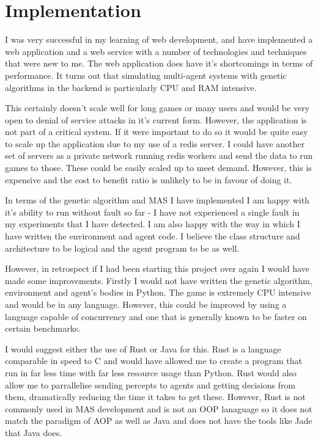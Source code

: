 \documentclass[]{final_report}
\begin{document}
\section{Implementation}
I was very successful in my learning of web development, and have implemented a web application and a web service with a number of technologies and techniques that were new to me. The web application does have it's shortcomings in terms of performance. It turns out that simulating multi-agent systems with genetic algorithms in the backend is particularly CPU and RAM intensive.\par 
This certainly doesn't scale well for long games or many users and would be very open to denial of service attacks in it's current form. However, the application is not part of a critical system. If it were important to do so it would be quite easy to scale up the application due to my use of a redis server. I could have another set of servers as a private network running redis workers and send the data to run games to those. These could be easily scaled up to meet demand. However, this is expensive and the cost to benefit ratio is unlikely to be in favour of doing it.\par
In terms of the genetic algorithm and MAS I have implemented I am happy with it's ability to run without fault so far - I have not experienced a single fault in my experiments that I have detected. I am also happy with the way in which I have written the environment and agent code. I believe the class structure and architecture to be logical and the agent program to be as well.\par
However, in retrospect if I had been starting this project over again I would have made some improvements. Firstly I would not have written the genetic algorithm, environment and agent's bodies in Python. The game is extremely CPU intensive and would be in any language. However, this could be improved by using a language capable of concurrency and one that is generally known to be faster on certain benchmarks.\par 
I would suggest either the use of Rust or Java for this. Rust is a language comparable in speed to C and would have allowed me to create a program that run in far less time with far less resource usage than Python. Rust would also allow me to parrallelise sending percepts to agents and getting decisions from them, dramatically reducing the time it takes to get these. However, Rust is not commonly used in MAS development and is not an OOP lanaguage so it does not match the paradigm of AOP as well as Java and does not have the tools like Jade that Java does.\par 
\end{document}
